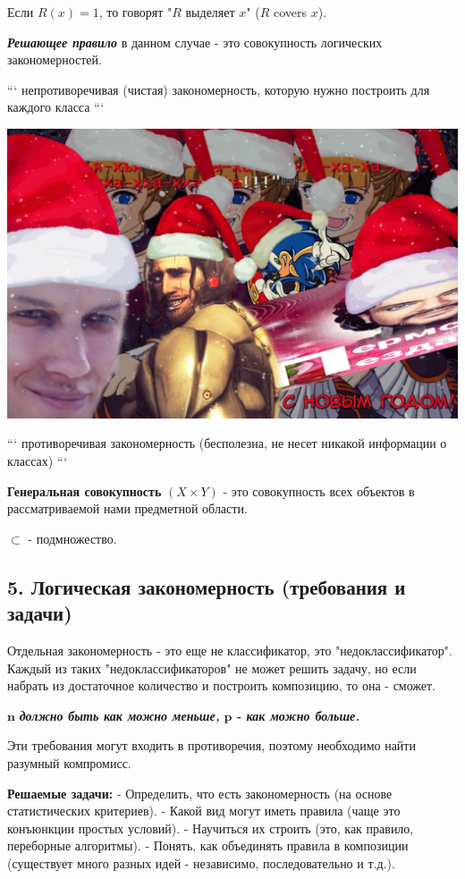 Если $R(x) = 1$, то говорят "$R$ выделяет $x$" ($R$ covers $x$).

\textbf{\textit{Решающее правило}} в данном случае - это совокупность логических
закономерностей.

```
непротиворечивая (чистая) закономерность, которую нужно построить для
каждого класса
```

\includegraphics[scale=0.3]{figures/samplefigure.jpg}

```
противоречивая закономерность (бесполезна, не несет никакой информации о классах)
```

\textbf{Генеральная совокупность} $(X \times Y)$ - это совокупность всех
объектов в рассматриваемой нами предметной области.

$\subset$ - подмножество.

\subsection{5. Логическая закономерность (требования и задачи)}

Отдельная закономерность - это еще не классификатор, это
"недоклассификатор".
Каждый из таких "недоклассификаторов" не может решить задачу, но если
набрать из достаточное количество и построить композицию, то она - сможет.

$\mathbf{n}$ \textbf{\textit{должно быть как можно меньше,}} $\mathbf{p}$
\textbf{\textit{- как можно больше.}}

Эти требования могут входить в противоречия, поэтому необходимо найти
разумный компромисс.

\textbf{Решаемые задачи:}
- Определить, что есть закономерность (на основе статистических критериев).
- Какой вид могут иметь правила (чаще это конъюнкции простых условий).
- Научиться их строить (это, как правило, переборные алгоритмы).
- Понять, как объединять правила в композиции (существует много разных
идей - независимо, последовательно и т.д.).

